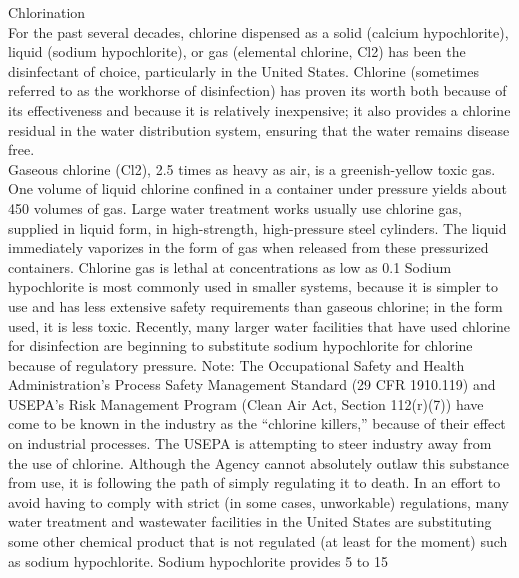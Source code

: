 Chlorination\\
For the past several decades, chlorine dispensed as a solid (calcium hypochlorite), liquid (sodium hypochlorite), or gas (elemental chlorine, Cl2) has been the disinfectant of choice, particularly in the United States. Chlorine (sometimes referred to as the workhorse of disinfection) has proven its worth both because of its effectiveness and because it is relatively inexpensive; it also provides a chlorine residual in the water distribution system, ensuring that the water remains disease free.\\
Gaseous chlorine (Cl2), 2.5 times as heavy as air, is a greenish-yellow toxic gas. One volume of liquid chlorine confined in a container under pressure yields about 450 volumes of gas. Large water treatment works usually use chlorine gas, supplied in liquid form, in high-strength, high-pressure steel cylinders. The liquid immediately vaporizes in the form of gas when released from these pressurized containers. Chlorine gas is lethal at concentrations as low as 0.1%
Sodium hypochlorite is most commonly used in smaller systems, because it is simpler to use and has less extensive safety requirements than gaseous chlorine; in the form used, it is less toxic. Recently, many larger water facilities that have used chlorine for disinfection are beginning to substitute sodium hypochlorite for chlorine because of regulatory pressure.
Note: The Occupational Safety and Health Administration’s Process Safety Management Standard (29 CFR 1910.119) and USEPA’s Risk Management Program (Clean Air Act, Section 112(r)(7)) have come to be known in the industry as the “chlorine killers,” because of their effect on industrial processes. The USEPA is attempting to steer industry away from the use of chlorine. Although the Agency cannot absolutely outlaw this substance from use, it is following the path of simply regulating it to death. In an effort to avoid having to comply with strict (in some cases, unworkable) regulations, many water treatment and wastewater facilities in the United States are substituting some other chemical product that is not regulated (at least for the moment) such as sodium hypochlorite. Sodium hypochlorite provides 5 to 15%
